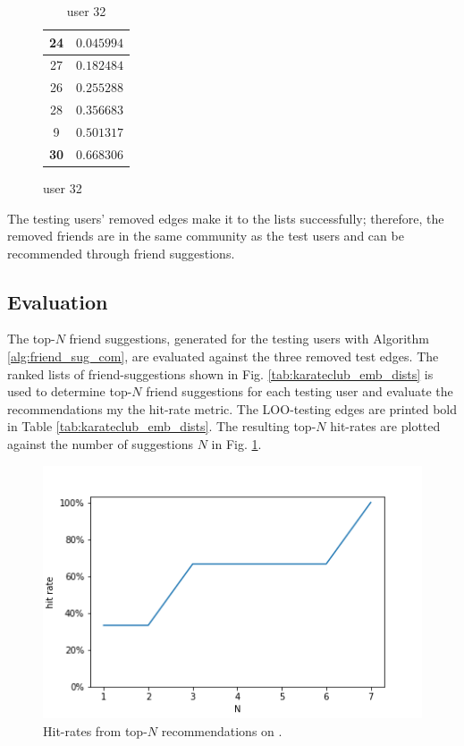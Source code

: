\documentclass[conference]{IEEEtran}
\begin{document}
\begin{table}
\begin{subfigure}{.4\textwidth}
\begin{tabular}{ c | r }
            \hline
            24          & $0.045994$ \\
            \hline
            27          & $0.182484$ \\
            \hline
            26          & $0.255288$ \\
            \hline
            28          & $0.356683$ \\
            \hline
            9           & $0.501317$ \\
            \hline
            \textbf{30} & $0.668306$ \\
        \end{tabular}
        \caption{user 32}
    \end{subfigure}
\end{table}

The testing users' removed edges make it to the lists successfully; therefore, the removed friends are in the same community as the test users and can be recommended through friend suggestions.

\subsection{Evaluation}

The top-$N$ friend suggestions, generated for the testing users with Algorithm \ref{alg:friend_sug_com}, are evaluated against the three removed test edges.
The ranked lists of friend-suggestions shown in Fig. \ref{tab:karateclub_emb_dists} is used to determine top-$N$ friend suggestions for each testing user and evaluate the recommendations my the hit-rate metric. The LOO-testing edges are printed bold in Table \ref{tab:karateclub_emb_dists}. The resulting top-$N$ hit-rates are plotted against the number of suggestions $N$ in Fig. \ref{fig:karateclub_hitrates}.

\begin{figure}[htbp]
    \centering
    \includegraphics[width=.4\textwidth]{images/karateclub/hit_rates.png}
    \caption{Hit-rates from top-$N$ recommendations on .}
    \label{fig:karateclub_hitrates}
\end{figure}
\end{document}
